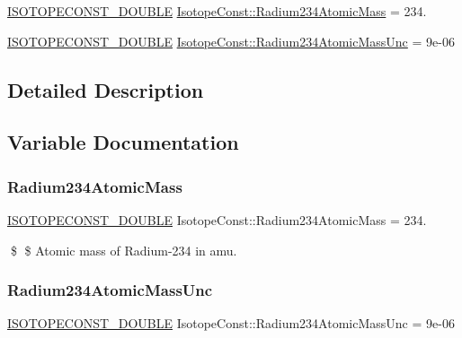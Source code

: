 \begin{DoxyCompactItemize}
\item 
\mbox{\hyperlink{group___isotope_const-_macros_ga8f45a7272ce02c0b4c65c44636ed719a}{I\+S\+O\+T\+O\+P\+E\+C\+O\+N\+S\+T\+\_\+\+D\+O\+U\+B\+LE}} \mbox{\hyperlink{group___isotope_const-_radium-_ra234_gaa20be6c2ac57090d879339d2ebbf587f}{Isotope\+Const\+::\+Radium234\+Atomic\+Mass}} = 234.
\item 
\mbox{\hyperlink{group___isotope_const-_macros_ga8f45a7272ce02c0b4c65c44636ed719a}{I\+S\+O\+T\+O\+P\+E\+C\+O\+N\+S\+T\+\_\+\+D\+O\+U\+B\+LE}} \mbox{\hyperlink{group___isotope_const-_radium-_ra234_gaf2d999223cbb193d1f213e50d4d3f568}{Isotope\+Const\+::\+Radium234\+Atomic\+Mass\+Unc}} = 9e-\/06
\end{DoxyCompactItemize}


\subsection{Detailed Description}


\subsection{Variable Documentation}
\mbox{\label{group___isotope_const-_radium-_ra234_gaa20be6c2ac57090d879339d2ebbf587f}} 
\subsubsection{\texorpdfstring{Radium234\+Atomic\+Mass}{Radium234AtomicMass}}
{\footnotesize\ttfamily \mbox{\hyperlink{group___isotope_const-_macros_ga8f45a7272ce02c0b4c65c44636ed719a}{I\+S\+O\+T\+O\+P\+E\+C\+O\+N\+S\+T\+\_\+\+D\+O\+U\+B\+LE}} Isotope\+Const\+::\+Radium234\+Atomic\+Mass = 234.}

\$ \$ Atomic mass of Radium-\/234 in amu. \mbox{\label{group___isotope_const-_radium-_ra234_gaf2d999223cbb193d1f213e50d4d3f568}} 
\subsubsection{\texorpdfstring{Radium234\+Atomic\+Mass\+Unc}{Radium234AtomicMassUnc}}
{\footnotesize\ttfamily \mbox{\hyperlink{group___isotope_const-_macros_ga8f45a7272ce02c0b4c65c44636ed719a}{I\+S\+O\+T\+O\+P\+E\+C\+O\+N\+S\+T\+\_\+\+D\+O\+U\+B\+LE}} Isotope\+Const\+::\+Radium234\+Atomic\+Mass\+Unc = 9e-\/06}

